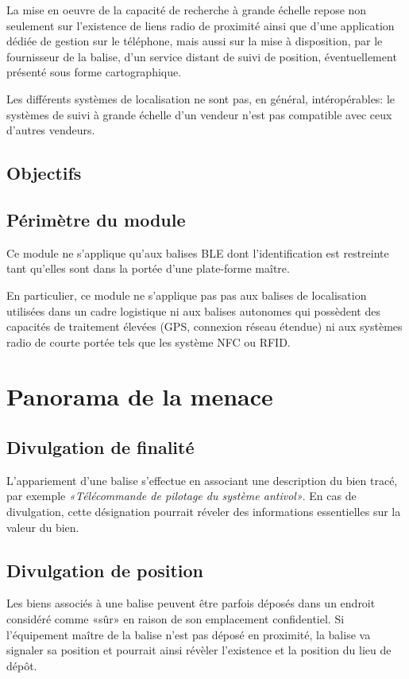 \documentclass[headings=small,cmyk,french,a4paper,twocolumn,garamond,11pt]{scrartcl}
\begin{document}
La mise en oeuvre de la capacité de recherche à grande échelle repose
non seulement sur l'existence de liens radio de proximité ainsi que
d'une application dédiée de gestion sur le téléphone, mais aussi sur
la mise à disposition, par le fournisseur de la balise, d'un service
distant de suivi de position, éventuellement présenté sous forme
cartographique.

Les différents systèmes de localisation ne sont pas, en général,
intéropérables: le systèmes de suivi à grande échelle d'un vendeur
n'est pas compatible avec ceux d'autres vendeurs.


\subsection{Objectifs}

\subsection{Périmètre du module}
Ce module ne s'applique qu'aux balises \gls{BLE} dont l'identification
est restreinte tant qu'elles sont dans la portée d'une plate-forme
maître.

En particulier, ce module ne s'applique pas pas aux balises de
localisation utilisées dans un cadre logistique ni aux balises
autonomes qui possèdent des capacités de traitement élevées (GPS,
connexion réseau étendue) ni aux systèmes radio de courte portée tels
que les système NFC ou RFID.

\section{Panorama de la menace}
\subsection{Divulgation de finalité}
L'appariement d'une balise s'effectue en associant une description 
du bien tracé, par exemple \textsl{«Télécommande de pilotage du
  système antivol»}. En cas de divulgation, cette désignation pourrait
réveler des informations essentielles sur la valeur du bien.

\subsection{Divulgation  de position}
Les biens associés à une balise peuvent être parfois déposés
dans un endroit considéré comme «sûr» en raison de son emplacement
confidentiel.  Si l'équipement maître de la balise n'est pas déposé en
proximité, la balise va signaler sa position et pourrait ainsi révèler
l'existence et la position du lieu de dépôt.
\end{document}
